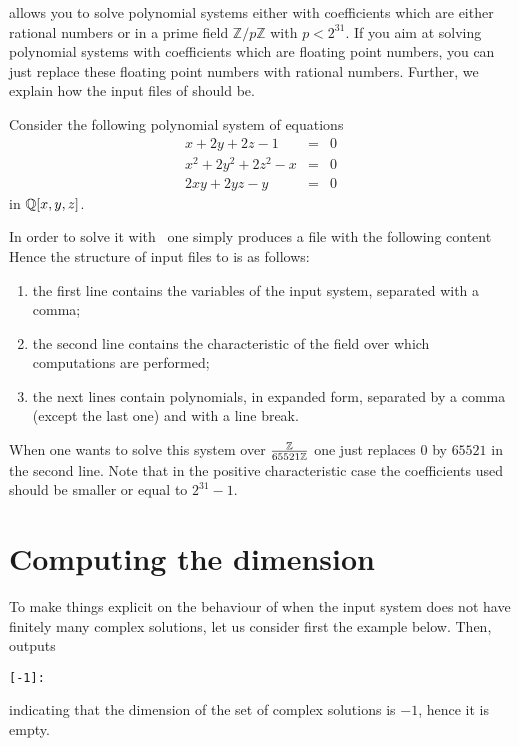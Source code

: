 \documentclass[a4paper,english,11pt]{scrartcl}
\theoremstyle{definition}
\theoremstyle{remark}
\begin{document}
\msolve allows you to solve polynomial systems either with coefficients
which are either rational numbers or in a prime field $\mathbb{Z}/p\mathbb{Z}$
with $p < 2^{31}$. If you aim at solving polynomial systems with coefficients
which are floating point numbers, you can just replace these floating point
numbers with rational numbers. Further, we explain how the input files of
\msolve should be.

Consider the following polynomial system of equations
\[
  \begin{array}{rcl}
    x+2 y+2 z-1 &= &0\\
    x^2+2 y^2+2 z^2-x &= &0\\
    2 x y+2 y z-y &= &0
  \end{array}
\]
in $\mathbb{Q}[x,y,z]$.

In order to solve it with \msolve~one simply produces a file with the following content
Hence the structure of input files to \msolve is as follows:
\begin{enumerate}
\item the first line contains the variables of the input system, separated with
  a comma; 
\item the second line contains the characteristic of the field over which
  computations are performed; 
\item the next lines contain polynomials, in expanded form, separated by a comma
  (except the last one) and with a line break. 
\end{enumerate}



When one wants to solve this system over $\frac{\mathbb{Z}}{65521\mathbb{Z}}$ one just replaces
$0$ by $65521$ in the second line. Note that in the positive characteristic case
the coefficients used should be smaller or equal to $2^{31}-1$.


\section{Computing the dimension}\label{sec:dim}

To make things explicit on the behaviour of \msolve when the input system
does not have finitely many complex solutions, let us consider first the example
below.
Then, \msolve outputs
\begin{tcolorbox}
  \begin{lstlisting}[basicstyle=\normalsize\ttfamily]
[-1]:
  \end{lstlisting}
\end{tcolorbox}
indicating that the dimension of the set of complex solutions is $-1$, hence it
is empty.
\end{document}
